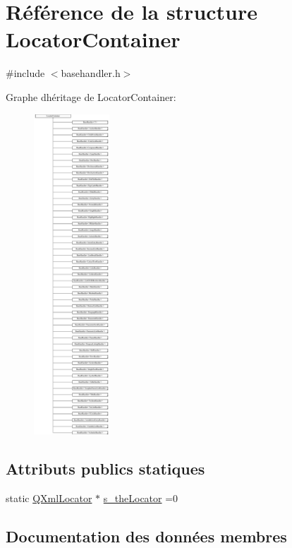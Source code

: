 \hypertarget{struct_locator_container}{}\section{Référence de la structure Locator\+Container}
\label{struct_locator_container}


{\ttfamily \#include $<$basehandler.\+h$>$}

Graphe d\textquotesingle{}héritage de Locator\+Container\+:\begin{figure}[H]
\begin{center}
\leavevmode
\includegraphics[height=12.000000cm]{struct_locator_container}
\end{center}
\end{figure}
\subsection*{Attributs publics statiques}
\begin{DoxyCompactItemize}
\item 
static \hyperlink{class_q_xml_locator}{Q\+Xml\+Locator} $\ast$ \hyperlink{struct_locator_container_aad414c38f6b321ec0b5907872987a92e}{s\+\_\+the\+Locator} =0
\end{DoxyCompactItemize}


\subsection{Documentation des données membres}
\hypertarget{struct_locator_container_aad414c38f6b321ec0b5907872987a92e}{}
